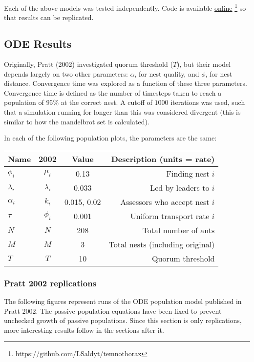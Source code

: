 \documentclass{article}
\begin{document}
Each of the above models was tested independently. Code is available \href{https://github.com/LSaldyt/temnothorax}{online} \footnote{https://github.com/LSaldyt/temnothorax} so that results can be replicated. 

\subsection{ODE Results}
Originally, Pratt (2002) investigated quorum threshold ($T$), but their model depends largely on two other parameters: $\alpha$, for nest quality, and $\phi$, for nest distance.
Convergence time was explored as a function of these three parameters. 
Convergence time is defined as the number of timesteps taken to reach a population of $95\%$ at the correct nest.
A cutoff of $1000$ iterations was used, such that a simulation running for longer than this was considered divergent (this is similar to how the mandelbrot set is calculated).

In each of the following population plots, the parameters are the same: \\

\begin{tabular}{ l | c | c | r }
    \hline
  Name          & 2002        & Value & Description (units = rate)\\ \hline
  {$\phi_i$}      & $\mu_i$     & 0.13 & Finding nest $i$\\
  {$\lambda_i$}   & $\lambda_i$ & 0.033 & Led by leaders to $i$\\
  {$\alpha_i$}    & $k_i$       & 0.015, 0.02 & Assessors who accept nest $i$\\ \hline
  {$\tau$}        & $\phi_i$    & 0.001  & Uniform transport rate $i$\\
  $N$             & $N$    & 208  & Total number of ants\\
  $M$             & $M$    & 3  & Total nests (including original)\\
  $T$             & $T$    & 10 & Quorum threshold\\
    \hline
\end{tabular}


\subsubsection{Pratt 2002 replications}
The following figures represent runs of the ODE population model published in Pratt 2002.
The passive population equations have been fixed to prevent unchecked growth of passive populations.
Since this section is only replications, more interesting results follow in the sections after it. 
\end{document}
